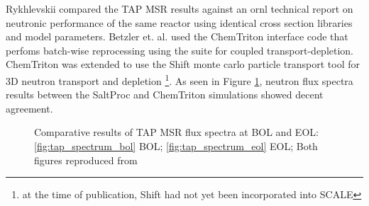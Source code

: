 
Rykhlevskii compared the TAP MSR results against an \Gls{ornl} technical report
on neutronic performance of the same reactor\cite{betzler_assessment_2017} using
identical cross section libraries and model parameters.
Betzler et. al. used the ChemTriton\cite{betzler_molten_2017} interface code
that perfoms batch-wise reprocessing using the \SCALE suite for coupled
transport-depletion. ChemTriton was extended to use the
Shift\cite{davidson_nuclide_2018} monte carlo particle transport tool for 3D
neutron transport and depletion \footnote{at the time of publication, Shift had
not yet been incorporated into SCALE}. As seen in Figure \ref{fig:tap_spectra}, neutron flux
spectra results between the SaltProc and ChemTriton simulations showed decent
agreement.

\begin{figure}[htpb]
    \centering
    \caption[Comparative results of TAP MSR flux spectra at BOL and EOL]{
        Comparative results of TAP MSR flux spectra at BOL and EOL:
        \ref{fig:tap_spectrum_bol} BOL;
        \ref{fig:tap_spectrum_eol} EOL;
        Both figures reproduced from \cite{rykhlevskii_fuel_2020}
    }
    \label{fig:tap_spectra}
\end{figure}

